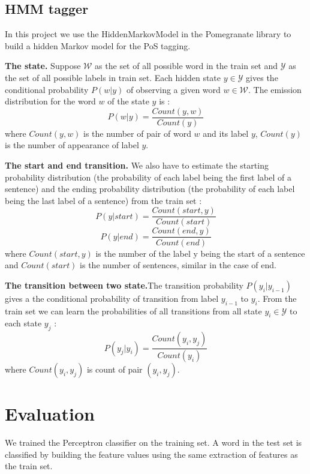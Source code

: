 \documentclass{article}
\def\WW{{\mathcal{W}}}
\def\YY{{\mathcal{Y}}}
\begin{document}
\subsection{HMM tagger}
In this project we use the HiddenMarkovModel in the Pomegranate library to build a hidden Markov model for the PoS tagging.

\textbf{The state.} Suppose $\WW$ as the set of all possible word in the train set and $\YY$ as the set of all possible labels in train set. Each hidden state $y \in \YY$ gives the conditional probability $P(w|y)$ of observing a given word $w \in \WW$. The emission distribution for the word $w$ of the state $y$ is : $$P(w|y) = \frac{Count(y,w)}{Count(y)}$$ where $Count(y,w)$ is the number of pair of word $w$ and its label $y$, $Count(y)$ is the number of appearance of label $y$.

\textbf{The start and end transition.} We also have to estimate the starting probability distribution (the probability of each label being the first label of a sentence) and the ending probability distribution (the probability of each label being the last label of a sentence) from the train set : $$P(y|start) = \frac{Count(start, y)}{Count(start)}$$ 
$$P(y|end) = \frac{Count(end, y)}{Count(end)}$$ where $Count(start, y)$ is the number of the label y being the start of a sentence and $Count(start)$ is the number of sentences, similar in the case of end.

\textbf{The transition between two state.}The transition probability $P(y_i|y_{i-1})$ gives a the conditional probability of transition from label $y_{i-1}$ to $y_i$. From the train set we can learn the probabilities of all transitions from all state $y_i \in \YY$ to each state $y_j$ :
$$P(y_j|y_i) = \frac{Count(y_i, y_j)}{Count(y_i)}$$ where $Count(y_i, y_j)$ is count of pair $(y_i, y_j)$.



\section{Evaluation}
We trained the Perceptron classifier on the training set. A word in the test set is classified by  building the feature values using the same extraction of features as the train set. 
\end{document}
